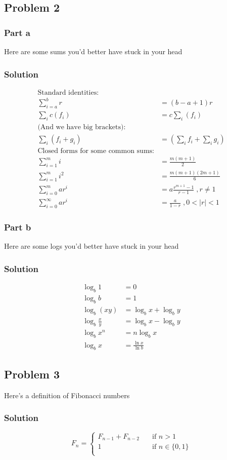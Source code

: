 \documentclass[10pt,letterpaper,oneside]{article}
\newcommand{\Problem}[1]{\subsection*{Problem #1}}
\newcommand{\Part}[1]{\subsubsection*{Part #1}}
\newenvironment{Solution}
{
	\color{blue!80!black}
	\subsubsection*{Solution}
}
{}
\begin{document}
\Problem{2}

	\Part{a}
	Here are some sums you'd better have stuck in your head

	\begin{Solution}
		\begin{align}
			\text{Standard identities:} \nonumber \\
			\sum_{i=a}^b r  & = (b-a+1)r \\
			\sum_{i} c(f_i) & = c\sum_{i} (f_i) \\
			\text{(And we have big brackets):} \nonumber \\
			\sum_{i} (f_i+g_i) & = \left(\sum_{i} f_i + \sum_{i} g_i\right) \\
			\text{Closed forms for some common sums:} \nonumber \\
			\sum_{i=1}^m i  & = \frac{m(m+1)}{2} \\
			\sum_{i=1}^m i^2  & = \frac{m(m+1)(2m+1)}{6} \\
			\sum_{i=0}^m ar^i  & = a\frac{r^{m+1}-1}{r-1} \;,r\neq1 \\
			\sum_{i=0}^\infty ar^i  & = \frac{a}{1-r} \;,0<|r|<1 
		\end{align}
	\end{Solution}

	\Part{b}
	Here are some logs you'd better have stuck in your head

	\begin{Solution}
		\begin{align}
			\log_b 1 & = 0 \\
			\log_b b & = 1 \\
			\log_b (xy) & = \log_b x + \log_b y \\
			\log_b\frac{x}{y} & = \log_b x - \log_b y \\
			\log_b x^n & = n\log_b x \\
			\log_b x & = \frac{\ln{x}}{\ln{b}} 
		\end{align}
	\end{Solution}

\Problem{3}
	Here's a definition of Fibonacci numbers

	\begin{Solution}
		\[
			F_n = \left\lbrace%
			\begin{array}{cc}
				F_{n-1} + F_{n-2} & \quad \mbox{if $n>1$} \\
				1 & \quad \mbox{if $n \in{} \{0,1\}$} \\
			\end{array} \right.
		\]
	\end{Solution}
\end{document}
